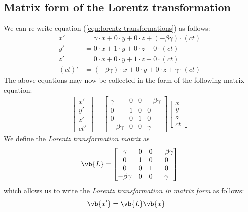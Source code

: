	\subsection{Matrix form of the Lorentz transformation}
		We can re-write equation (\ref{eqn:lorentz-transformations}) as follows:
		\begin{align*}
			x'&=\gamma\cdot x+0\cdot y+0\cdot z+(-\beta\gamma)\cdot(ct) \\
			y'&=0\cdot x+1\cdot y+0\cdot z+0\cdot(ct) \\
			z'&=0\cdot x+0\cdot y+1\cdot z+0\cdot(ct) \\
			(ct)'&=(-\beta\gamma)\cdot x+0\cdot y+0\cdot z+\gamma\cdot(ct)
		\end{align*}
		The above equations may now be collected in the form of the following matrix equation:
		\begin{align*}
			\begin{bmatrix}
				{x'} \\
				{y'} \\
				{z'} \\
				{ct'}
			\end{bmatrix}=\begin{bmatrix}
				{\gamma} & {0} & {0} & {-\beta\gamma} \\
				{0} & {1} & {0} & {0} \\
				{0} & {0} & {1} & {0} \\
				{-\beta\gamma} & {0} & {0} & {\gamma}
			\end{bmatrix}\begin{bmatrix}
			{x} \\
			{y} \\
			{z} \\
			{ct}
			\end{bmatrix}
		\end{align*}
		We define the \emph{Lorentz transformation matrix} as
		\begin{align*}
			\vb{L}=\begin{bmatrix}
				{\gamma} & {0} & {0} & {-\beta\gamma} \\
				{0} & {1} & {0} & {0} \\
				{0} & {0} & {1} & {0} \\
				{-\beta\gamma} & {0} & {0} & {\gamma}
			\end{bmatrix}
		\end{align*}
		which allows us to write the \emph{Lorentz transformation in matrix form} as follows:
		\begin{align*}
			\vb{x'}&=\vb{L}\vb{x}
		\end{align*}
